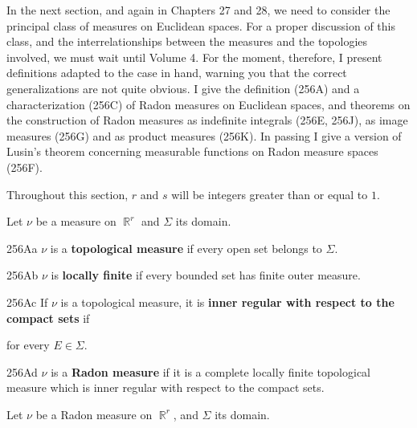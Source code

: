 
\def\chaptername{Product measures}
\def\sectionname{Radon measures on $\BbbR^r$}


\def\headlinesectionname{Radon measures on {$\eightBbb R^r$}}

In the next section, and again in Chapters 27 and 28,
we need to consider the principal class of measures on Euclidean spaces.
For a proper discussion of this class, and the interrelationships
between the measures and the topologies involved, we must wait until
Volume 4.   For the moment, therefore, I present definitions adapted to
the case in hand, warning you that the correct generalizations are not
quite obvious.   I give the definition (256A) and a characterization
(256C) of Radon measures on Euclidean spaces, and theorems on the
construction of
Radon measures as indefinite integrals (256E, 256J), as image measures
(256G) and as product measures (256K).   In passing I give a version of
Lusin's theorem concerning measurable functions on Radon measure spaces
(256F).

Throughout this section, $r$ and $s$ will be integers greater than or equal
to $1$.

 Let $\nu$ be a measure on $\BbbR^r$ 
and $\Sigma$ its domain.

\spheader 256Aa $\nu$ is a {\bf topological measure} if every open set
belongs to $\Sigma$.   

\spheader 256Ab $\nu$ is {\bf locally finite} if every bounded set has
finite outer measure.

\spheader 256Ac If $\nu$ is a topological measure, it is {\bf inner
regular with respect to the compact sets} if


\noindent for every $E\in\Sigma$.   

\spheader 256Ad $\nu$ is a {\bf Radon measure} if it is a complete
locally finite topological measure which is inner regular with respect
to the compact sets.


 Let $\nu$ be a Radon measure on $\BbbR^r$, and
$\Sigma$ its domain.

